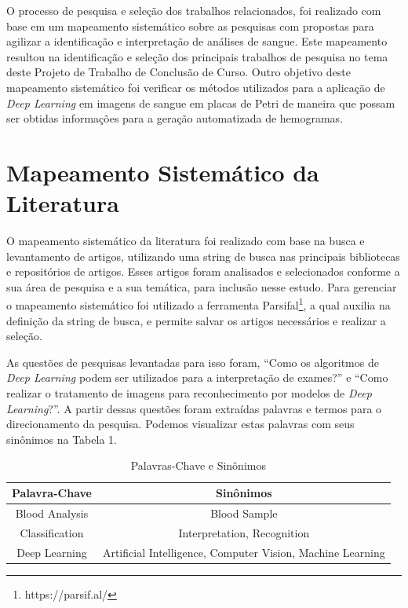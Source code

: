 O processo de pesquisa e seleção dos trabalhos relacionados, foi realizado com base em um mapeamento sistemático sobre as pesquisas com propostas para agilizar a identificação e interpretação de análises de sangue. Este mapeamento resultou na identificação e seleção dos principais trabalhos de pesquisa no tema deste Projeto de Trabalho de Conclusão de Curso. Outro objetivo deste mapeamento sistemático foi verificar os métodos utilizados para a aplicação de \emph{Deep Learning} em imagens de sangue em placas de Petri de maneira que possam ser obtidas informações para a geração automatizada de hemogramas.

\section{Mapeamento Sistemático da Literatura}

O mapeamento sistemático da literatura foi realizado com base na busca e levantamento de artigos, utilizando uma string de busca nas principais bibliotecas e repositórios de artigos. Esses artigos foram analisados e selecionados conforme a sua área de pesquisa e a sua temática, para inclusão nesse estudo. Para gerenciar o mapeamento sistemático foi utilizado a ferramenta Parsifal\footnote[1]{https://parsif.al/}, a qual auxilia na definição da string de busca, e permite salvar os artigos necessários e realizar a seleção.

As questões de pesquisas levantadas para isso foram, ``Como os algoritmos de \emph{Deep Learning} podem ser utilizados para a interpretação de exames?'' e ``Como realizar o tratamento de imagens para reconhecimento por modelos de \emph{Deep Learning}?''. A partir dessas questões foram extraídas palavras e termos para o direcionamento da pesquisa. Podemos visualizar estas palavras com seus sinônimos na Tabela 1.

\begin{table}[!htb]
	\centering
	\caption{Palavras-Chave e Sinônimos}
	\label{tbl:palavrasChave}
	\begin{tabular}{|c|c|}
		\hline
		\textbf{Palavra-Chave} & \textbf{Sinônimos}                                        \\ \hline
		Blood Analysis         & Blood Sample                                               \\ \hline
		Classification         & Interpretation, Recognition                                \\ \hline
		Deep Learning          & Artificial Intelligence, Computer Vision, Machine Learning \\ \hline
	\end{tabular}
	\vspace{6pt}
\end{table}

